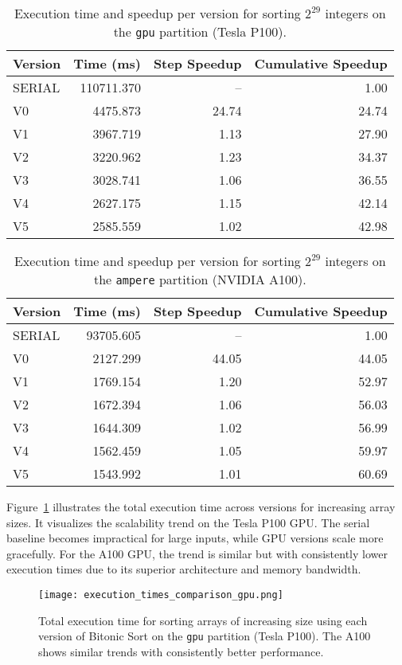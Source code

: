 \documentclass{article}
\begin{document}
\begin{table}[H]
\centering
\begin{tabular}{|l|r|r|r|}
\hline
\textbf{Version} & \textbf{Time (ms)} & \textbf{Step Speedup} & \textbf{Cumulative Speedup} \\
\hline
SERIAL & 110711.370 & --   & 1.00 \\
V0     & 4475.873   & 24.74 & 24.74 \\
V1     & 3967.719   & 1.13  & 27.90 \\
V2     & 3220.962   & 1.23  & 34.37 \\
V3     & 3028.741   & 1.06  & 36.55 \\
V4     & 2627.175   & 1.15  & 42.14 \\
V5     & 2585.559   & 1.02  & 42.98 \\
\hline
\end{tabular}
\caption{Execution time and speedup per version for sorting $2^{29}$ integers on the \texttt{gpu} 
partition (Tesla P100).}
\label{tab:speedup-vs-version-gpu}
\end{table}

\begin{table}[H]
\centering
\begin{tabular}{|l|r|r|r|}
\hline
\textbf{Version} & \textbf{Time (ms)} & \textbf{Step Speedup} & \textbf{Cumulative Speedup} \\
\hline
SERIAL & 93705.605 & --   & 1.00 \\
V0     & 2127.299   & 44.05 & 44.05 \\
V1     & 1769.154   & 1.20  & 52.97 \\
V2     & 1672.394   & 1.06  & 56.03 \\
V3     & 1644.309   & 1.02  & 56.99 \\
V4     & 1562.459   & 1.05  & 59.97 \\
V5     & 1543.992   & 1.01  & 60.69 \\
\hline
\end{tabular}
\caption{Execution time and speedup per version for sorting $2^{29}$ integers on the \texttt{ampere} 
partition (NVIDIA A100).}
\label{tab:speedup-vs-version-ampere}
\end{table}

Figure~\ref{fig:execution_times_comparison_gpu} illustrates the total execution time across versions for increasing 
array sizes. It visualizes the scalability trend on the Tesla P100 GPU. The serial baseline becomes impractical for 
large inputs, while GPU versions scale more gracefully. For the A100 GPU, the trend is similar but with consistently 
lower execution times due to its superior architecture and memory bandwidth.

\begin{figure}[H]
    \centering
    \texttt{[image: execution\_times\_comparison\_gpu.png]}
    \caption{Total execution time for sorting arrays of increasing size using each version of Bitonic Sort on 
    the \texttt{gpu} partition (Tesla P100). The A100 shows similar trends with consistently better performance.}
    \label{fig:execution_times_comparison_gpu}
\end{figure}
\end{document}
